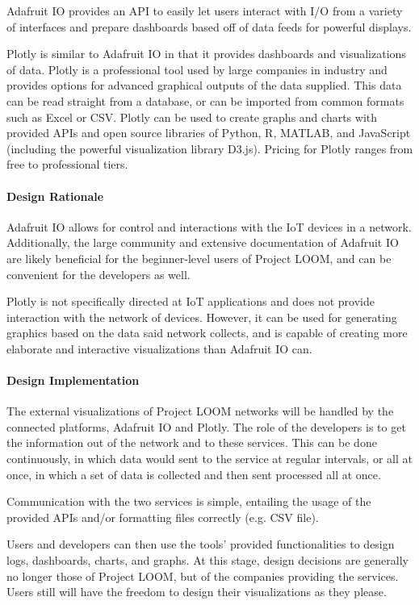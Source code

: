 \documentclass[onecolumn, draftclsnofoot,10pt, compsoc]{IEEEtran}
\begin{document}
    Adafruit IO provides an API to easily let users interact with I/O from a variety of interfaces and prepare dashboards based off of data feeds for powerful displays. \cite{adafruitio}

    Plotly is similar to Adafruit IO in that it provides dashboards and visualizations of data. Plotly is a professional tool used by large companies in industry and provides options for advanced graphical outputs of the data supplied. This data can be read straight from a database, or can be imported from common formats such as Excel or CSV. Plotly can be used to create graphs and charts with provided APIs and open source libraries of Python, R, MATLAB, and JavaScript (including the powerful visualization library D3.js). Pricing for Plotly ranges from free to professional tiers. \cite{plotly}

\paragraph{Design Rationale}
    Adafruit IO allows for control and interactions with the IoT devices in a network. Additionally, the large community and extensive documentation of Adafruit IO are likely beneficial for the beginner-level users of Project LOOM, and can be convenient for the developers as well.

    Plotly is not specifically directed at IoT applications and does not provide interaction with the network of devices. However, it can be used for generating graphics based on the data said network collects, and is capable of creating more elaborate and interactive visualizations than Adafruit IO can.

\paragraph{Design Implementation}
    The external visualizations of Project LOOM networks will be handled by the connected platforms, Adafruit IO and Plotly. The role of the developers is to get the information out of the network and to these services. This can be done continuously, in which data would sent to the service at regular intervals, or all at once, in which a set of data is collected and then sent processed all at once. 

    Communication with the two services is simple, entailing the usage of the provided APIs and/or formatting files correctly (e.g. CSV file).

    Users and developers can then use the tools' provided functionalities to design logs, dashboards, charts, and graphs. At this stage, design decisions are generally no longer those of Project LOOM, but of the companies providing the services. Users still will have the freedom to design their visualizations as they please.
\end{document}
